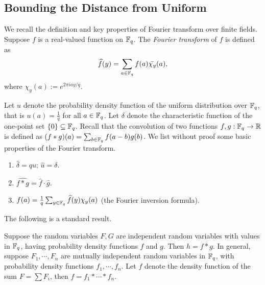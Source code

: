 \documentclass[envcountsect]{llncs}
\begin{document}
\subsection{Bounding the Distance from Uniform}

We recall the definition and key properties of Fourier transform over finite fields.
Suppose $f$ is a real-valued function on $\mathbb{F}_q$. The {\it Fourier transform} of $f$ is defined as
\[
    \widehat{f}(y) = \sum_{a \in \mathbb{F}_q} f(a) \bar{\chi_y}(a),
\]
where $\chi_y(a) := e^{2 \pi i ay/q}$.

Let $u$ denote the probability density function of the uniform distribution over $\mathbb{F}_q$, that is $u(a) = \frac{1}{q}$ for all $a \in \mathbb{F}_q$. Let $\delta$ denote the characteristic function of the
one-point set $\{0\} \subseteq \mathbb{F}_q$. Recall that the convolution of two functions $f,g: \mathbb{F}_q \to \mathbb{R}$ is
defined as $(f  \ast g ) (a) = \sum_{b \in \mathbb{F}_q} f(a-b)g(b)$. We list without proof some basic properties of the Fourier transform.
\begin{enumerate}
\item $\widehat{\delta} = qu$; $\widehat{u} = \delta$.
\item $\widehat{f \ast g} = \widehat{f} \cdot \widehat{g}$. 
\item $f(a) = \frac{1}{q} \sum_{y \in \mathbb{F}_q} \widehat{f}(y)\chi_y(a)$ (the Fourier inversion formula).
\end{enumerate}

The following is a standard result.

\begin{lemma}
Suppose the random variables $F,G$ are independent random variables with values in $\mathbb{F}_q$, having probability density functions $f$ and $g$.  Then $h =  f \ast g$.
In general, suppose $F_1, \cdots, F_n$ are mutually independent random variables in $\mathbb{F}_q$, with probability density functions $f_1, \cdots, f_n$. Let $f$ denote the density function of the sum $F = \sum F_i$, then $f = f_1 \ast \cdots \ast f_n$.
\end{lemma}

\end{document}
